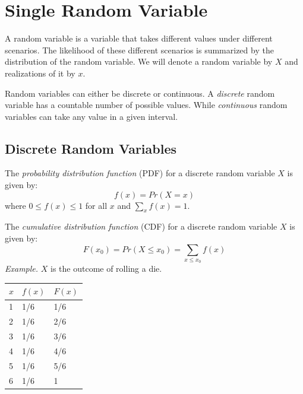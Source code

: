 \documentclass{./../../Latex/handout}
\begin{document}
\thispagestyle{plain}

\newcommand{\mytitle}{Random Variables}
\myheader{\mytitle}

\vspace{-1cm}
\section{Single Random Variable}

A random variable is a variable that takes different values under different scenarios. The likelihood of these different scenarios is summarized by the distribution of the random variable. We will denote a random variable by $X$ and realizations of it by $x$. 

Random variables can either be discrete or continuous. A \textit{discrete} random variable has a countable number of possible values. While \textit{continuous} random variables can take any value in a given interval. 

\subsection{Discrete Random Variables}

The \textit{probability distribution function} (PDF) for a discrete random variable $X$ is given by:
$$ f(x) = Pr(X=x) $$
where $0 \leq f(x) \leq 1$ for all $x$ and $\sum_x f(x) = 1$. 

The \textit{cumulative distribution function} (CDF) for a discrete random variable $X$ is given by: 
$$ F(x_0) = Pr(X \leq x_0) = \sum_{x \leq x_0} f(x) $$ 
\textit{Example.} $X$ is the outcome of rolling a die. \vspace{-0.4cm}
\begin{center}
\begin{tabularx}{0.5\textwidth}{XXX}
\toprule
$x$ & $f(x)$ & $F(x)$ \\ 
\midrule
1 & 1/6 & 1/6 \\
2 & 1/6 & 2/6 \\
3 & 1/6 & 3/6 \\
4 & 1/6 & 4/6 \\
5 & 1/6 & 5/6 \\
6 & 1/6 & 1 \\
\bottomrule
\end{tabularx}
\end{center}
\end{document}
